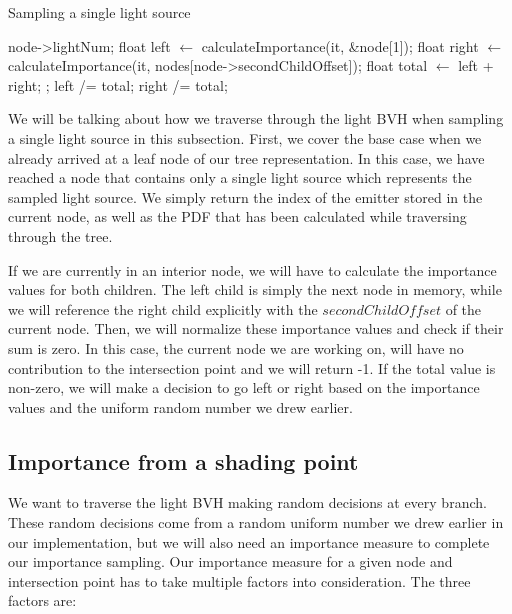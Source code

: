 \begin{algorithm}
	\caption{Sampling a single light source}
	\label{alg:sample1}
	\begin{algorithmic}[1] %
		\State \Return node->lightNum;
		\EndIf
		\State float left $\gets$ calculateImportance(it, \&node[1]);
		\State float right $\gets$ calculateImportance(it, nodes[node->secondChildOffset]);
		\State float total $\gets$ left + right;
		\State {};
		\EndIf
		\State left /= total;
		\State right /= total;
				\State <branch according to importance and sample1D>
		\EndProcedure
	\end{algorithmic}
\end{algorithm}

We will be talking about how we traverse through the light BVH when sampling a single light source in this subsection. First, we cover the base case when we already arrived at a leaf node of our tree representation. In this case, we have reached a node that contains only a single light source which represents the sampled light source. We simply return the index of the emitter stored in the current node, as well as the PDF that has been calculated while traversing through the tree.

If we are currently in an interior node, we will have to calculate the importance values for both children. The left child is simply the next node in memory, while we will reference the right child explicitly with the $secondChildOffset$ of the current node. Then, we will normalize these importance values and check if their sum is zero. In this case, the current node we are working on, will have no contribution to the intersection point and we will return -1. If the total value is non-zero, we will make a decision to go left or right based on the importance values and the uniform random number we drew earlier.

\subsection{Importance from a shading point}
\label{subs:imp}

We want to traverse the light BVH making random decisions at every branch. These random decisions come from a random uniform number we drew earlier in our implementation, but we will also need an importance measure to complete our importance sampling. Our importance measure for a given node and intersection point has to take multiple factors into consideration. The three factors are:

